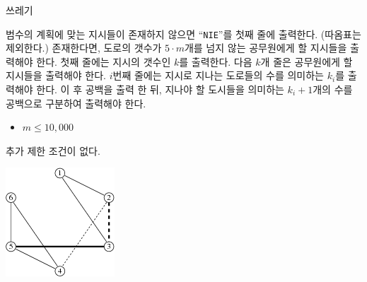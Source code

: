 \begin{problem}{쓰레기}
	\OutputFile
	
	범수의 계획에 맞는 지시들이 존재하지 않으면 ``\texttt{NIE}''를 첫째 줄에 출력한다. (따옴표는 제외한다.) 존재한다면, 도로의 갯수가 $5 \cdot m$개를 넘지 않는 공무원에게 할 지시들을 출력해야 한다. 첫째 줄에는 지시의 갯수인 $k$를 출력한다. 다음 $k$개 줄은 공무원에게 할 지시들을 출력해야 한다. $i$번째 줄에는 지시로 지나는 도로들의 수를 의미하는 $k_i$를 출력해야 한다. 이 후 공백을 출력 한 뒤, 지나야 할 도시들을 의미하는 $k_i + 1$개의 수를 공백으로 구분하여 출력해야 한다.


\begin{itemize}
	\item $m \le 10, 000$
\end{itemize}


추가 제한 조건이 없다.
	
	\Examples
		
	\begin{example}
	\end{example}
	
	\Note
	\begin{center}
	\includegraphics[]{smi.png}
	\end{center}
\end{problem}

